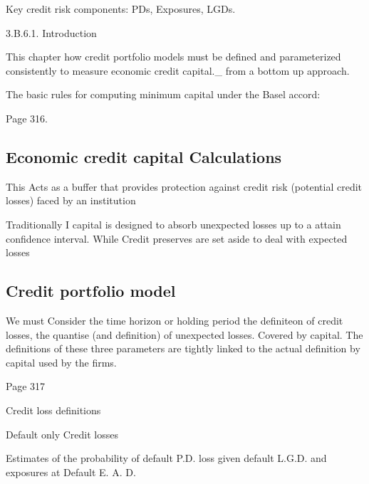 Key credit risk components: PDs, Exposures, LGDs. 


 



3.B.6.1. Introduction 


This chapter how credit portfolio models must be defined and parameterized consistently to measure economic credit capital._ from a bottom up approach.

 

The basic rules for computing minimum capital under the Basel accord:

Page 316.

\subsection*{Economic credit capital Calculations}

This Acts as a buffer that provides protection against credit risk (potential credit losses) faced by an institution

 

Traditionally I capital is designed to absorb unexpected losses up to a attain confidence interval. While Credit preserves are set aside to deal with expected losses

 

\subsection*{Credit portfolio model}

We must Consider the time horizon or holding period the definiteon of credit losses, the quantise (and definition) of unexpected losses. Covered by capital. The definitions of these three parameters are tightly linked to the actual definition by capital used by the firms.






Page 317

Credit loss definitions

Default only Credit losses

Estimates of the probability of default P.D. loss given default L.G.D. and exposures at Default E. A. D.




